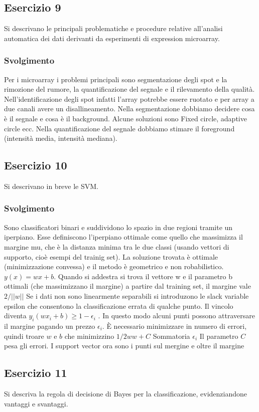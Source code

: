 \documentclass{article}
\begin{document}
\subsection*{Esercizio 9}
Si descrivano le principali problematiche e procedure relative all'analisi automatica dei dati
derivanti da esperimenti di expression microarray.
\subsubsection*{Svolgimento}
Per i microarray i problemi principali sono segmentazione degli spot e la rimozione del rumore, la
quantificazione del segnale e il rilevamento della qualità. Nell'identificazione degli spot infatti l'array
potrebbe essere ruotato e per array a due canali avere un disallineamento. Nella segmentazione dobbiamo
decidere cosa è il segnale e cosa è il background. Alcune soluzioni sono Fixed circle, adaptive circle ecc.
Nella quantificazione del segnale dobbiamo stimare il foreground (intensità media, intensità mediana).

\subsection*{Esercizio 10}
Si descrivano in breve le SVM.
\subsubsection*{Svolgimento}
Sono classificatori binari e suddividono lo spazio in due regioni tramite un iperpiano. Esse definiscono
l'iperpiano ottimale come quello che massimizza il margine mu, che è la distanza minima tra le due classi
(usando vettori di supporto, cioè esempi del trainig set). La soluzione trovata è ottimale (minimizzazione
convessa) e il metodo è geometrico e non robabilistico. $y(x)= wx + b$. Quando si addestra si trova il
vettore w e il parametro b ottimali (che massimizzano il margine) a partire dal training set, il margine
vale $2/||w||$
Se i dati non sono linearmente separabili si introduzono le slack variable epsilon che consentono la
classificazione errata di qualche punto. Il vincolo diventa $y_i(wx_i + b) \geq 1-\epsilon_i$ . In questo modo alcuni
punti possono attraversare il margine pagando un prezzo $\epsilon_i$. È necessario minimizzare in numero
di errori, quindi troare $w$ e $b$ che minimizzino $1/2ww+C$ Sommatoria $\epsilon_i$
Il parametro $C$ pesa gli errori. I support vector ora sono i punti sul mergine e oltre il margine

\subsection*{Esercizio 11}
Si descriva la regola di decisione di Bayes per la classificazione, evidenziandone vantaggi e
svantaggi.
\end{document}
